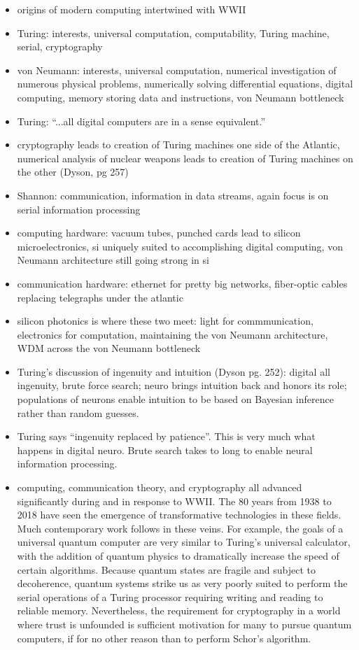 \documentclass[twocolumn]{article}
\begin{document}
\vspace{4em}
\begin{itemize}
\item origins of modern computing intertwined with WWII
\item Turing: interests, universal computation, computability, Turing machine, serial, cryptography
\item von Neumann: interests, universal computation, numerical investigation of numerous physical problems, numerically solving differential equations, digital computing, memory storing data and instructions, von Neumann bottleneck
\item Turing: ``...all digital computers are in a sense equivalent.'' \cite{tu1950}
\item cryptography leads to creation of Turing machines one side of the Atlantic, numerical analysis of nuclear weapons leads to creation of Turing machines on the other (Dyson, pg 257)
\item Shannon: communication, information in data streams, again focus is on serial information processing
\item computing hardware: vacuum tubes, punched cards lead to silicon microelectronics, si uniquely suited to accomplishing digital computing, von Neumann architecture still going strong in si
\item communication hardware: ethernet for pretty big networks, fiber-optic cables replacing telegraphs under the atlantic
\item silicon photonics is where these two meet: light for commmunication, electronics for computation, maintaining the von Neumann architecture, WDM across the von Neumann bottleneck
\item Turing's discussion of ingenuity and intuition (Dyson pg. 252): digital all ingenuity, brute force search; neuro brings intuition back and honors its role; populations of neurons enable intuition to be based on Bayesian inference rather than random guesses.
\item Turing says ``ingenuity replaced by patience''. This is very much what happens in digital neuro. Brute search takes to long to enable neural information processing.
\item computing, communication theory, and cryptography all advanced significantly during and in response to WWII. The 80 years from 1938 to 2018 have seen the emergence of transformative technologies in these fields. Much contemporary work follows in these veins. For example, the goals of a universal quantum computer are very similar to Turing's universal calculator, with the addition of quantum physics to dramatically increase the speed of certain algorithms. Because quantum states are fragile and subject to decoherence, quantum systems strike us as very poorly suited to perform the serial operations of a Turing processor requiring writing and reading to reliable memory. Nevertheless, the requirement for cryptography in a world where trust is unfounded is sufficient motivation for many to pursue quantum computers, if for no other reason than to perform Schor's algorithm.

\end{itemize}
\end{document}
